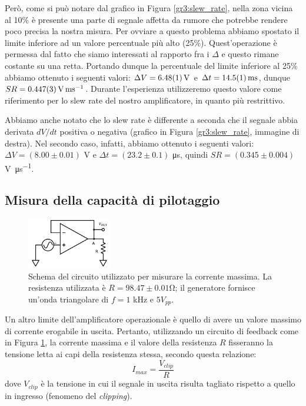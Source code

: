 Però, come si può notare dal grafico in Figura \ref{gr3:slew_rate}, nella zona vicina al 10\% è presente una parte di segnale affetta da rumore che potrebbe rendere poco precisa la nostra misura.
Per ovviare a questo problema abbiamo spostato il limite inferiore ad un valore percentuale più alto (25\%).
Quest'operazione è permessa dal fatto che siamo interessati al rapporto fra i $\Delta$ e questo rimane costante su una retta.
Portando dunque la percentuale del limite inferiore al 25\% abbiamo ottenuto i seguenti valori: $\Delta V = \SI{6.48 \pm 0.01}{\volt}$ e $\Delta t = \SI{14.5 \pm 0.1}{\ms}$, dunque $SR = \SI{0.447 \pm 0.003}{\volt\per\ms}$. Durante l'esperienza utilizzeremo questo valore come riferimento per lo slew rate del nostro amplificatore, in quanto più restrittivo.

Abbiamo anche notato che lo slew rate è differente a seconda che il segnale abbia derivata $dV/dt$ positiva o negativa (grafico in Figura \ref{gr3:slew_rate}, immagine di destra).
Nel secondo caso, infatti, abbiamo ottenuto i seguenti valori: $\Delta V = (8.00 \pm 0.01)$ \si{\volt} e $\Delta t = (23.2 \pm 0.1)$ \si{\micro\second}, quindi $SR = (0.345 \pm 0.004)$ \si{\volt\per\micro\second}.

\subsection{Misura della capacità di pilotaggio}

\begin{figure}
  \begin{center}
    \includegraphics[width=0.33\textwidth]{../E03/latex/max_current.pdf}
  \end{center}
  \caption{Schema del circuito utilizzato per misurare la corrente massima. La resistenza utilizzata è $R=98.47\pm0.01$\si{\ohm}; il generatore fornisce un'onda triangolare di $f=1$ \si{\kilo\hertz} e $5 V_{pp}$.}
  \label{cir3:max_current}
\end{figure}

Un altro limite dell'amplificatore operazionale è quello di avere un valore massimo di corrente erogabile in uscita.
Pertanto, utilizzando un circuito di feedback come in Figura \ref{cir3:max_current}, la corrente massima e il valore della resistenza $R$ fisseranno la tensione letta ai capi della resistenza stessa, secondo questa relazione:
\begin{equation*}
	I_{max} = \frac{V_{clip}}{R}
\end{equation*}
dove $V_{clip}$ è la tensione in cui il segnale in uscita risulta tagliato rispetto a quello in ingresso (fenomeno del \textit{clipping}).

